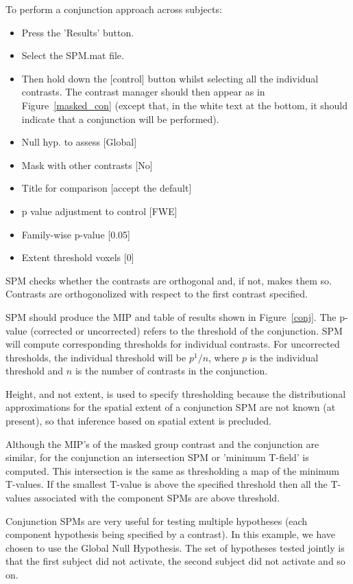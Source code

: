 To perform a conjunction approach across subjects:
\begin{itemize}
\item{Press the 'Results' button.}
\item{Select the SPM.mat file.}
\item{Then hold down the [control] button whilst selecting all the individual contrasts. The contrast manager should then appear as in Figure~\ref{masked_con} (except that, in the white text at the bottom, it should indicate that a conjunction will be performed).}
\item{Null hyp. to assess [Global]}
\item{Mask with other contrasts [No]}
\item{Title for comparison [accept the default]}
\item{p value adjustment to control [FWE]}
\item{Family-wise p-value [0.05]}
\item{Extent threshold {voxels} [0]}
\end{itemize}
SPM checks whether the contrasts are orthogonal and, if not,
makes them so. Contrasts are orthogonolized with respect to the first contrast specified.

SPM should produce the MIP and table of results shown in
Figure~\ref{conj}. The p-value (corrected or uncorrected) refers to the threshold of the conjunction. SPM will compute corresponding thresholds for individual contrasts. For uncorrected thresholds, the individual threshold will be $p^1/n$, where $p$ is the individual threshold and $n$ is
the number of contrasts in the conjunction.

Height, and not extent, is used to specify thresholding because the distributional approximations for the spatial extent of a conjunction SPM are not known (at present), so that inference based on spatial extent is precluded.

Although the MIP's of the masked group contrast and the conjunction are similar, for the conjunction an intersection SPM or 'minimum T-field' is computed.   This intersection is the same as thresholding a map of the minimum T-values. If the smallest T-value is above the specified threshold then all the T-values associated with the component SPMs are above threshold.

Conjunction SPMs are very useful for testing multiple hypotheses (each component hypothesis being specified by a contrast). In this example, we have chosen to use the
Global Null Hypothesis. The set of hypotheses tested jointly is that the first subject did not activate, the second subject did not activate and so on.

